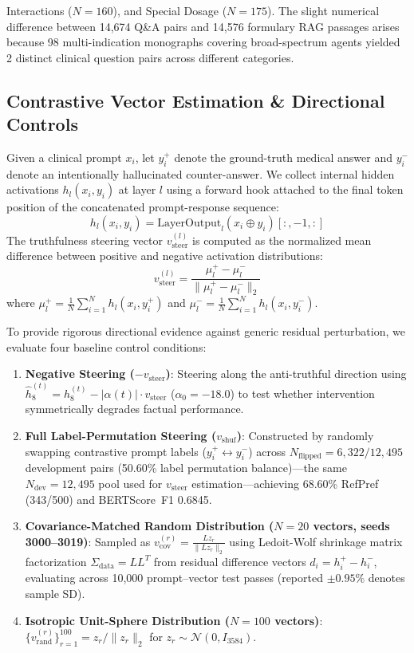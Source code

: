Interactions ($N=160$), and Special Dosage ($N=175$). The slight numerical difference between 14,674 Q\&A pairs and 14,576 formulary RAG passages arises because 98 multi-indication monographs covering broad-spectrum agents yielded 2 distinct clinical question pairs across different categories.

\subsection{Contrastive Vector Estimation \& Directional Controls}
Given a clinical prompt $x_i$, let $y_i^+$ denote the ground-truth medical answer and $y_i^-$ denote an intentionally hallucinated counter-answer. We collect internal hidden activations $h_l(x_i, y_i)$ at layer $l$ using a forward hook attached to the final token position of the concatenated prompt-response sequence:
\begin{equation}
h_l(x_i, y_i) = \text{LayerOutput}_l(x_i \oplus y_i)[:, -1, :]
\end{equation}
The truthfulness steering vector $v_{\text{steer}}^{(l)}$ is computed as the normalized mean difference between positive and negative activation distributions:
\begin{equation}
v_{\text{steer}}^{(l)} = \frac{\mu_l^+ - \mu_l^-}{\|\mu_l^+ - \mu_l^-\|_2}
\end{equation}
where $\mu_l^+ = \frac{1}{N} \sum_{i=1}^N h_l(x_i, y_i^+)$ and $\mu_l^- = \frac{1}{N} \sum_{i=1}^N h_l(x_i, y_i^-)$.

To provide rigorous directional evidence against generic residual perturbation, we evaluate four baseline control conditions:
\begin{enumerate}
    \item \textbf{Negative Steering ($-v_{\text{steer}}$)}: Steering along the anti-truthful direction using $\hat{h}_8^{(t)} = h_8^{(t)} - |\alpha(t)| \cdot v_{\text{steer}}$ ($\alpha_0=-18.0$) to test whether intervention symmetrically degrades factual performance.
    \item \textbf{Full Label-Permutation Steering ($v_{\text{shuf}}$)}: Constructed by randomly swapping contrastive prompt labels ($y_i^+ \leftrightarrow y_i^-$) across $N_{\text{flipped}}=6,322 / 12,495$ development pairs (50.60\% label permutation balance)---the same $N_{\text{dev}}=12,495$ pool used for $v_{\text{steer}}$ estimation---achieving 68.60\% RefPref (343/500) and BERTScore~F1 0.6845.
    \item \textbf{Covariance-Matched Random Distribution ($N=20$ vectors, seeds 3000--3019)}: Sampled as $v_{\text{cov}}^{(r)} = \frac{L z_r}{\|L z_r\|_2}$ using Ledoit-Wolf shrinkage matrix factorization $\Sigma_{\text{data}} = L L^T$ from residual difference vectors $d_i = h_i^+ - h_i^-$, evaluating across 10,000 prompt--vector test passes (reported $\pm0.95\%$ denotes sample SD).
    \item \textbf{Isotropic Unit-Sphere Distribution ($N=100$ vectors)}: $\{v_{\text{rand}}^{(r)}\}_{r=1}^{100} = z_r / \|z_r\|_2$ for $z_r \sim \mathcal{N}(0, I_{3584})$.
\end{enumerate}

